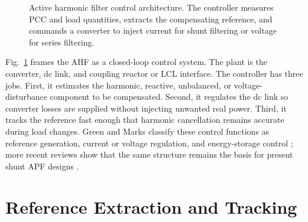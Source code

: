 \documentclass[conference]{IEEEtran}
\begin{document}
\begin{figure}[!t]
\centering
{}
\caption{Active harmonic filter control architecture. The controller measures PCC and load quantities, extracts the compensating reference, and commands a converter to inject current for shunt filtering or voltage for series filtering.}
\label{fig:architecture}
\end{figure}

Fig.~\ref{fig:architecture} frames the AHF as a closed-loop control system. The plant is the converter, dc link, and coupling reactor or LCL interface. The controller has three jobs. First, it estimates the harmonic, reactive, unbalanced, or voltage-disturbance component to be compensated. Second, it regulates the dc link so converter losses are supplied without injecting unwanted real power. Third, it tracks the reference fast enough that harmonic cancellation remains accurate during load changes. Green and Marks classify these control functions as reference generation, current or voltage regulation, and energy-storage control \cite{Green2005}; more recent reviews show that the same structure remains the basis for present shunt APF designs \cite{Popescu2024}.

\section{Reference Extraction and Tracking}
\end{document}
